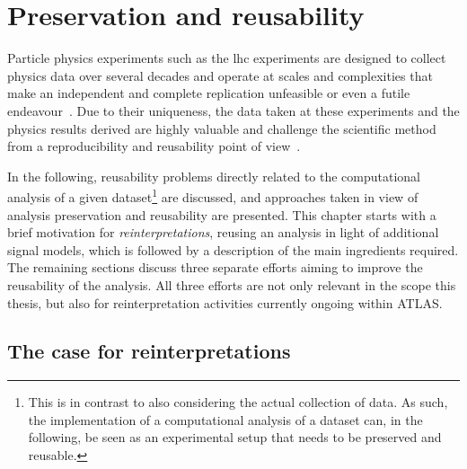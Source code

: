 
\chapter{Preservation and reusability}\label{ch:preservation}

\graphicspath{{chapter-preservation/Figs/Vector/}{chapter-preservation/Figs/}}

Particle physics experiments such as the \gls{lhc} experiments are designed to collect physics data over several decades and operate at scales and complexities that make an independent and complete replication unfeasible or even a futile endeavour~\cite{open_is_not_enough}.
Due to their uniqueness, the data taken at these experiments and the physics results derived are highly valuable and challenge the scientific method from a reproducibility and reusability point of view~\cite{open_is_not_enough}.

In the following, reusability problems directly related to the computational analysis of a given dataset\footnote{This is in contrast to also considering the actual collection of data. As such, the implementation of a computational analysis of a dataset can, in the following, be seen as an experimental setup that needs to be preserved and reusable.} are discussed, and approaches taken in view of analysis preservation and reusability are presented.
This chapter starts with a brief motivation for \textit{reinterpretations}, \ie reusing an analysis in light of additional signal models, which is followed by a description of the main ingredients required.
The remaining sections discuss three separate efforts aiming to improve the reusability of the \onelepton analysis. All three efforts are not only relevant in the scope 	 this thesis, but also for reinterpretation activities currently ongoing within ATLAS.

\section{The case for reinterpretations}\label{sec:reinterpretations}

